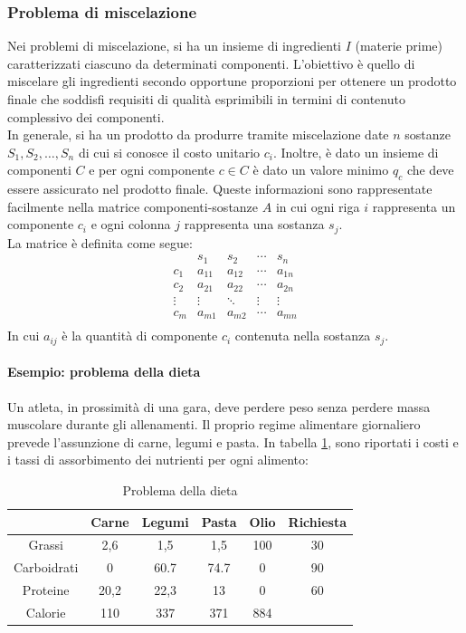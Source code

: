 \documentclass{article}
\begin{document}
\subsubsection{Problema di miscelazione}
Nei problemi di miscelazione, si ha un insieme di ingredienti $I$ (materie
prime) caratterizzati ciascuno da determinati componenti. L'obiettivo è quello
di miscelare gli ingredienti secondo opportune proporzioni per ottenere un
prodotto finale che soddisfi requisiti di qualità esprimibili in termini di
contenuto complessivo dei componenti.\\ 
In generale, si ha un prodotto da produrre tramite miscelazione date $n$ 
sostanze $S_1, S_2, \ldots, S_n$ di cui si conosce il costo unitario $c_i$.
Inoltre, è dato un insieme di componenti $C$ e per ogni componente $c \in C$ 
è dato un valore minimo $q_c$ che deve essere assicurato nel prodotto finale.
Queste informazioni sono rappresentate facilmente nella matrice
componenti-sostanze $A$ in cui ogni riga $i$ rappresenta un componente $c_i$
e ogni colonna $j$ rappresenta una sostanza $s_j$.\\ 
La matrice è definita come segue: 
\begin{equation*}
  \begin{matrix}
    & s_1 & s_2 & \cdots & s_n \\
    c_1 & a_{11} & a_{12} & \cdots & a_{1n} \\
    c_2 & a_{21} & a_{22} & \cdots & a_{2n} \\
    \vdots & \vdots & \ddots & \vdots & \vdots \\
    c_m & a_{m1} &a_{m2} & \cdots & a_{mn} \\
  \end{matrix}
\end{equation*}
In cui $a_{ij}$ è la quantità di componente $c_i$ contenuta nella sostanza $s_j$.\\
\paragraph{Esempio: problema della dieta}
Un atleta, in prossimità di una gara, deve perdere peso senza perdere massa 
muscolare durante gli allenamenti. Il proprio regime alimentare giornaliero 
prevede l’assunzione di carne, legumi e pasta. In tabella \ref{tab:dati_dieta},
sono riportati i costi e i tassi di assorbimento dei nutrienti per ogni alimento:
\begin{table}
  \center
  \begin{tabular}{|c|c|c|c|c|c|}
    \hline
    & Carne & Legumi & Pasta & Olio & Richiesta\\
    \hline
    Grassi & 2,6 & 1,5 & 1,5 & 100 & 30 \\
    Carboidrati & 0 & 60.7 & 74.7 & 0 & 90\\
    Proteine & 20,2 & 22,3 & 13 & 0 & 60\\
    \hline
    Calorie & 110 & 337 & 371 & 884 & \\
    \hline
  \end{tabular} 
  \caption{Problema della dieta}
  \label{tab:dati_dieta}
\end{table}
\end{document}
